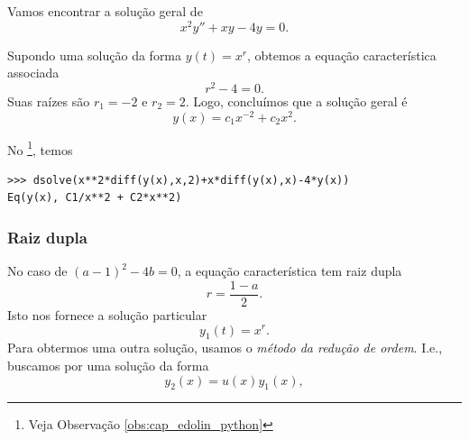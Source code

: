 \begin{ex}
  Vamos encontrar a solução geral de
  \begin{equation}
    x^2y'' + xy -4y = 0.
  \end{equation}

  Supondo uma solução da forma $y(t) = x^r$, obtemos a equação característica associada
  \begin{equation}
    r^2 - 4 = 0.
  \end{equation}
  Suas raízes são $r_1 = -2$ e $r_2 = 2$. Logo, concluímos que a solução geral é
  \begin{equation}
    y(x) = c_1x^{-2} + c_2x^2.
  \end{equation}

  \ifispython
  No \python\footnote{Veja Observação \ref{obs:cap_edolin_python}}, temos
\begin{verbatim}
>>> dsolve(x**2*diff(y(x),x,2)+x*diff(y(x),x)-4*y(x))
Eq(y(x), C1/x**2 + C2*x**2)
\end{verbatim}
  \fi
\end{ex}

\subsubsection{Raiz dupla}

No caso de $(a-1)^2-4b = 0$, a equação característica tem raiz dupla
\begin{equation}
  r = \frac{1-a}{2}.
\end{equation}
Isto nos fornece a solução particular
\begin{equation}
  y_1(t) = x^r.
\end{equation}
Para obtermos uma outra solução, usamos o \emph{método da redução de ordem}. I.e., buscamos por uma solução da forma
\begin{equation}
  y_2(x) = u(x)y_1(x),
\end{equation}

